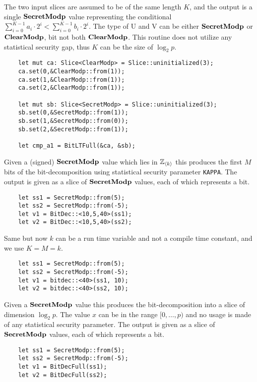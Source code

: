 The two input slices are assumed to be of the same length $K$, and 
the output is a single $\mathbf{SecretModp}$ value representing the conditional
$\sum_{i=0}^{K-1} a_i \cdot 2^i < \sum_{i=0}^{K-1} b_i \cdot 2^i$.
The type of U and V can be either $\mathbf{SecretModp}$ or $\mathbf{ClearModp}$,
bit not both $\mathbf{ClearModp}$.
This routine does not utilize any statistical security gap, thus
$K$ can be the size of $\log_2 p$.
\begin{lstlisting}
    let mut ca: Slice<ClearModp> = Slice::uninitialized(3);
    ca.set(0,&ClearModp::from(1));
    ca.set(1,&ClearModp::from(1));
    ca.set(2,&ClearModp::from(1));

    let mut sb: Slice<SecretModp> = Slice::uninitialized(3);
    sb.set(0,&SecretModp::from(1));
    sb.set(1,&SecretModp::from(0));
    sb.set(2,&SecretModp::from(1));

    let cmp_a1 = BitLTFull(&ca, &sb);
\end{lstlisting}

Given a (signed) $\mathbf{SecretModp}$ value which lies in ${\mathbb{Z}}_{\langle k \rangle}$
this produces the first $M$ bits of the bit-decomposition using 
statistical security parameter \verb|KAPPA|.
The output is given as a slice of $\mathbf{SecretModp}$ values, each
of which represents a bit.
\begin{lstlisting}
    let ss1 = SecretModp::from(5);
    let ss2 = SecretModp::from(-5);
    let v1 = BitDec::<10,5,40>(ss1);
    let v2 = BitDec::<10,5,40>(ss2);
\end{lstlisting}

Same but now $k$ can be a run time variable and not a compile time constant, 
and we use $K=M=k$.
\begin{lstlisting}
    let ss1 = SecretModp::from(5);
    let ss2 = SecretModp::from(-5);
    let v1 = bitdec::<40>(ss1, 10);
    let v2 = bitdec::<40>(ss2, 10);
\end{lstlisting}


Given a $\mathbf{SecretModp}$ value this produces the bit-decomposition
into a slice of dimension $\log_2 p$.
The value $x$ can be in the range $[0,\ldots,p)$ and no usage
is made of any statistical security parameter.
The output is given as a slice of $\mathbf{SecretModp}$ values, each
of which represents a bit.
\begin{lstlisting}
    let ss1 = SecretModp::from(5);
    let ss2 = SecretModp::from(-5);
    let v1 = BitDecFull(ss1);
    let v2 = BitDecFull(ss2);
\end{lstlisting}


